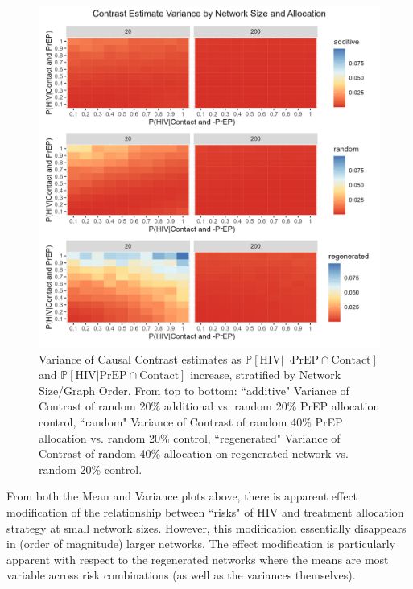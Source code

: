 \documentclass{article}
\theoremstyle{definition}
\begin{document}
\begin{figure}[H]
    \centering
    \includegraphics[width=\linewidth]{Figures/Network Size Variance plots.png}
    \caption{Variance of Causal Contrast estimates  as $\mathbb{P}\left[\text{HIV} \vert \neg \text{PrEP} \cap \text{Contact}\right]$ and $\mathbb{P}\left[\text{HIV} \vert \text{PrEP} \cap \text{Contact}\right]$ increase, stratified by Network Size/Graph Order. From top to bottom: ``additive" Variance of Contrast of random 20\% additional vs. random 20\% PrEP allocation control, ``random" Variance of Contrast of random 40\% PrEP allocation vs. random 20\% control, ``regenerated" Variance of Contrast of random 40\% allocation on regenerated network vs. random 20\% control.}
    \label{fig:Figure 8}
\end{figure}
From both the Mean and Variance plots above, there is apparent effect modification of the relationship between ``risks" of HIV and treatment allocation strategy at small network sizes. However, this modification essentially disappears in (order of magnitude) larger networks. The effect modification is particularly apparent with respect to the regenerated networks where the means are most variable across risk combinations (as well as the variances themselves).  
\end{document}
